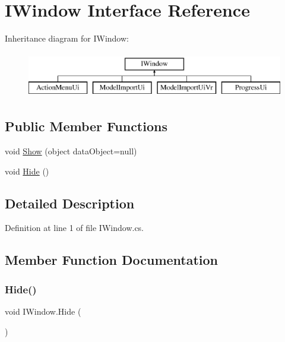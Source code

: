 \hypertarget{interface_i_window}{}\section{I\+Window Interface Reference}
\label{interface_i_window}
Inheritance diagram for I\+Window\+:\begin{figure}[H]
\begin{center}
\leavevmode
\includegraphics[height=2.000000cm]{interface_i_window}
\end{center}
\end{figure}
\subsection*{Public Member Functions}
\begin{DoxyCompactItemize}
\item 
void \mbox{\hyperlink{interface_i_window_aba12a3c53948d87aef07aed93b225aa9}{Show}} (object data\+Object=null)
\item 
void \mbox{\hyperlink{interface_i_window_a829d3aa9bcf80a75ba84968399492378}{Hide}} ()
\end{DoxyCompactItemize}


\subsection{Detailed Description}


Definition at line 1 of file I\+Window.\+cs.



\subsection{Member Function Documentation}
\mbox{\label{interface_i_window_a829d3aa9bcf80a75ba84968399492378}} 
\subsubsection{\texorpdfstring{Hide()}{Hide()}}
{\footnotesize\ttfamily void I\+Window.\+Hide (\begin{DoxyParamCaption}{ }\end{DoxyParamCaption})}



